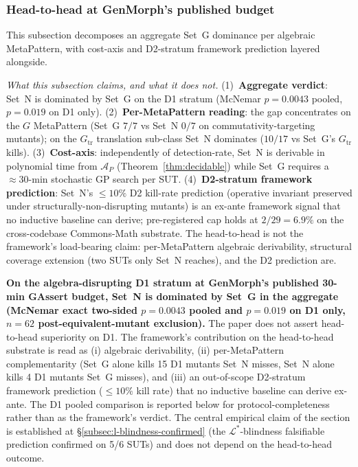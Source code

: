 \documentclass[acmsmall,screen,review]{acmart}
\begin{document}
\subsubsection{Head-to-head at GenMorph's published budget}
\label{subsec:pooled-headtohead}

This subsection decomposes an aggregate Set~G dominance per algebraic MetaPattern, with cost-axis and D2-stratum framework prediction layered alongside.

\begin{tcolorbox}[breakable,colback=gray!5,colframe=black!50,arc=2pt,boxrule=0.5pt,fontupper=\small,title=Scope of the head-to-head comparison,fonttitle=\small\bfseries]
\textit{What this subsection claims, and what it does not.} (1)~\textbf{Aggregate verdict}: Set~N is dominated by Set~G on the D1 stratum (McNemar $p = 0.0043$ pooled, $p = 0.019$ on D1 only). (2)~\textbf{Per-MetaPattern reading}: the gap concentrates on the $G$ MetaPattern (Set~G $7/7$ vs Set~N $0/7$ on commutativity-targeting mutants); on the $G_{\mathrm{tr}}$ translation sub-class Set~N dominates ($10/17$ vs Set~G's $G_{\mathrm{tr}}$ kills). (3)~\textbf{Cost-axis}: independently of detection-rate, Set~N is derivable in polynomial time from $\mathcal{A}_P$ (Theorem~\ref{thm:decidable}) while Set~G requires a $\approx 30$-min stochastic GP search per SUT. (4)~\textbf{D2-stratum framework prediction}: Set~N's $\le 10\%$ D2 kill-rate prediction (operative invariant preserved under structurally-non-disrupting mutants) is an ex-ante framework signal that no inductive baseline can derive; pre-registered cap holds at $2/29 = 6.9\%$ on the cross-codebase Commons-Math substrate. The head-to-head is not the framework's load-bearing claim: per-MetaPattern algebraic derivability, structural coverage extension (two SUTs only Set~N reaches), and the D2 prediction are.
\end{tcolorbox}

\textbf{On the algebra-disrupting D1 stratum at GenMorph's published
30-min GAssert budget, Set~N is dominated by Set~G in the aggregate
(McNemar exact two-sided $p = 0.0043$ pooled and $p = 0.019$ on D1
only, $n = 62$ post-equivalent-mutant exclusion).} The paper does not
assert head-to-head superiority on D1. The framework's contribution
on the head-to-head substrate is read as (i) algebraic derivability,
(ii) per-MetaPattern complementarity (Set~G alone kills 15 D1 mutants
Set~N misses, Set~N alone kills 4 D1 mutants Set~G misses), and
(iii) an out-of-scope D2-stratum framework prediction
($\le 10\%$ kill rate) that no inductive baseline can derive
ex-ante. The D1 pooled comparison is reported below for
protocol-completeness rather than as the framework's verdict. The
central empirical claim of the section is established at
\S\ref{subsec:l-blindness-confirmed} (the $\mathcal{L}^{*}$-blindness
falsifiable prediction confirmed on 5/6 SUTs) and does not depend on
the head-to-head outcome.
\end{document}
